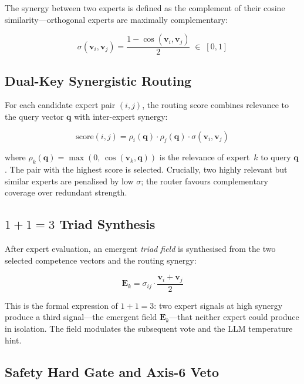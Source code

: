 \documentclass[11pt,a4paper]{article}
\begin{document}
The synergy between two experts is defined as the complement of their cosine
similarity—orthogonal experts are maximally complementary:

\begin{equation}
  \sigma(\mathbf{v}_i, \mathbf{v}_j)
    = \frac{1 - \cos(\mathbf{v}_i, \mathbf{v}_j)}{2}
    \;\in\; [0, 1]
  \label{eq:synergy}
\end{equation}

\subsection{Dual-Key Synergistic Routing}

For each candidate expert pair $(i, j)$, the routing score combines
relevance to the query vector $\mathbf{q}$ with inter-expert synergy:

\begin{equation}
  \mathrm{score}(i, j)
    = \rho_i(\mathbf{q}) \cdot \rho_j(\mathbf{q}) \cdot \sigma(\mathbf{v}_i, \mathbf{v}_j)
  \label{eq:routing}
\end{equation}

where $\rho_k(\mathbf{q}) = \max(0,\, \cos(\mathbf{v}_k, \mathbf{q}))$
is the relevance of expert~$k$ to query $\mathbf{q}$. The pair with the
highest score is selected. Crucially, two highly relevant but similar
experts are penalised by low $\sigma$; the router favours complementary
coverage over redundant strength.

\subsection{$1{+}1{=}3$ Triad Synthesis}

After expert evaluation, an emergent \emph{triad field} is synthesised from
the two selected competence vectors and the routing synergy:

\begin{equation}
  \mathbf{E}_k = \sigma_{ij} \cdot \frac{\mathbf{v}_i + \mathbf{v}_j}{2}
  \label{eq:triad}
\end{equation}

This is the formal expression of $1{+}1{=}3$: two expert signals at high
synergy produce a third signal—the emergent field $\mathbf{E}_k$—that
neither expert could produce in isolation. The field modulates the
subsequent vote and the LLM temperature hint.

\subsection{Safety Hard Gate and Axis-6 Veto}
\end{document}
